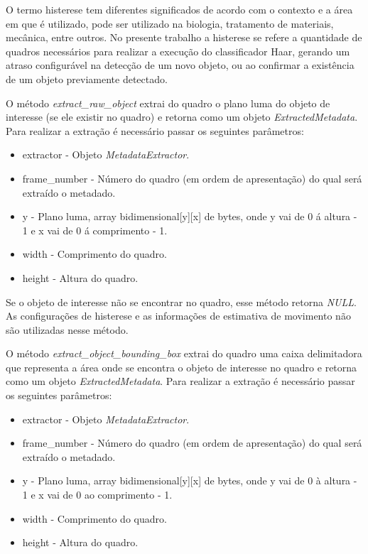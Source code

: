 O termo histerese tem diferentes significados de acordo com o contexto e a área em que é utilizado, pode ser utilizado na biologia, tratamento de materiais, mecânica, entre outros. No presente trabalho a histerese se refere a quantidade de quadros necessários para realizar a execução do classificador Haar, gerando um atraso configurável na detecção de um novo objeto, ou ao confirmar a existência de um objeto previamente detectado.

O método \textit{extract\_raw\_object} extrai do quadro o plano luma do objeto de interesse (se ele existir no quadro) e retorna como um objeto \textit{ExtractedMetadata}. Para realizar a extração é necessário passar os seguintes parâmetros:

\begin{itemize}
	\item extractor - Objeto \textit{MetadataExtractor}.
	\item frame\_number - Número do quadro (em ordem de apresentação) do qual será extraído o metadado.
	\item y - Plano luma, array bidimensional[y][x] de bytes, onde y vai de 0 á altura - 1 e x vai de 0 á comprimento - 1.
	\item width - Comprimento do quadro.
        \item height - Altura do quadro.
\end{itemize}

Se o objeto de interesse não se encontrar no quadro, esse método retorna \textit{NULL}. As configurações de histerese e as informações de estimativa de movimento não são utilizadas nesse método.

O método \textit{extract\_object\_bounding\_box} extrai do quadro uma caixa delimitadora que representa a área onde se encontra o objeto de interesse no quadro e retorna como um objeto \textit{ExtractedMetadata}. Para realizar a extração é necessário passar os seguintes parâmetros:

\begin{itemize}
	\item extractor - Objeto \textit{MetadataExtractor}.
	\item frame\_number - Número do quadro (em ordem de apresentação) do qual será extraído o metadado.
	\item y - Plano luma, array bidimensional[y][x] de bytes, onde y vai de 0 à altura - 1 e x vai de 0 ao comprimento - 1.
	\item width - Comprimento do quadro.
        \item height - Altura do quadro.
\end{itemize}

